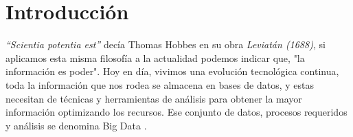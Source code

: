 \documentclass[a4paper, 12pt]{book}
\begin{document}




\tableofcontents 
\cleardoublepage
\listoffigures %
\cleardoublepage
\listoftables %
\cleardoublepage
\listoflistings


\cleardoublepage
\chapter{Introducción}
\label{sec:intro}

\textit{“Scientia potentia est”} decía Thomas Hobbes en su obra \textit{Leviatán (1688)}, si aplicamos esta misma filosofía a la actualidad podemos indicar que, "la información es poder". Hoy en día, vivimos una evolución tecnológica continua, toda la información que nos rodea se almacena en bases de datos, y estas necesitan de técnicas y herramientas de análisis para obtener la mayor información optimizando los recursos.
Ese conjunto de datos, procesos requeridos y análisis se denomina Big Data \cite{mayer2013big}.
\end{document}
